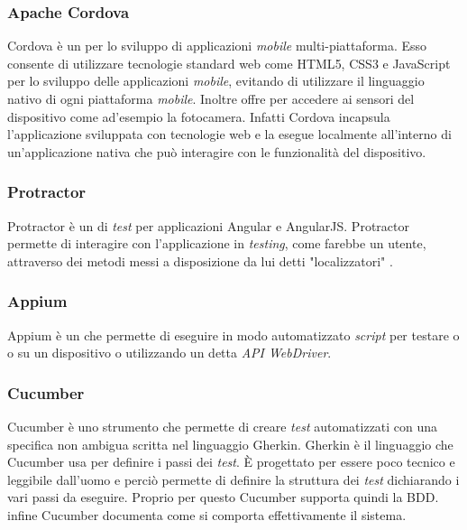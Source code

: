 \subsubsection*{Apache Cordova}
Cordova è un   per lo sviluppo di applicazioni \emph{mobile} multi-piattaforma. Esso consente di utilizzare tecnologie standard web come \gls{HTML}5, \gls{CSS}3 e JavaScript per lo sviluppo delle applicazioni \emph{mobile}, evitando di utilizzare il linguaggio nativo di ogni piattaforma \emph{mobile}. Inoltre offre  per accedere ai sensori del dispositivo come ad'esempio la fotocamera. Infatti Cordova incapsula l'applicazione sviluppata con tecnologie web e la esegue localmente all’interno di un’applicazione nativa che può interagire con le funzionalità del dispositivo.

\subsubsection*{Protractor}
Protractor è un  di \emph{test}  per applicazioni Angular e AngularJS. Protractor permette di interagire con l'applicazione in \emph{testing}, come farebbe un utente, attraverso dei metodi messi a disposizione da lui detti "localizzatori" .

\subsubsection*{Appium}
Appium è un   che permette di eseguire in modo automatizzato \emph{script} per testare \textcolor{SchoolColor}{\ap{[g]}} o \textcolor{SchoolColor}{\ap{[g]}} o \textcolor{SchoolColor}{\ap{[g]}} su un dispositivo  o  utilizzando un  detta \emph{API WebDriver}.

\subsubsection*{Cucumber}
Cucumber è uno strumento che permette di creare \emph{test} automatizzati con una specifica non ambigua scritta nel linguaggio Gherkin. Gherkin è il linguaggio che Cucumber usa per definire i passi dei \emph{test}. È progettato per essere poco tecnico e leggibile dall'uomo e perciò permette di definire la struttura dei \emph{test} dichiarando i vari passi da eseguire. Proprio per questo Cucumber supporta quindi la \gls{BDD}. infine Cucumber documenta come si comporta effettivamente il sistema.

